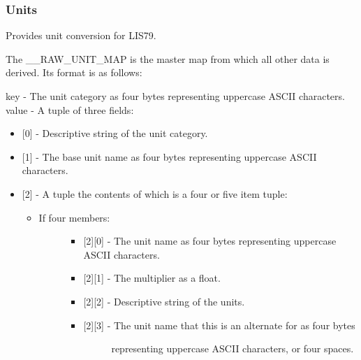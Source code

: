 \documentclass[letterpaper,10pt,english]{sphinxmanual}
\begin{document}
\subsubsection{Units}
\label{\detokenize{ref/LIS/core/Units:units}}\label{\detokenize{ref/LIS/core/Units::doc}}\label{\detokenize{ref/LIS/core/Units:module-TotalDepth.LIS.core.Units}}
Provides unit conversion for LIS79.

The \_\_RAW\_UNIT\_MAP is the master map from which all other data is derived.
Its format is as follows:

key - The unit category as four bytes representing uppercase ASCII characters.
value - A tuple of three fields:
\begin{itemize}
\item {} 
{[}0{]} - Descriptive string of the unit category.

\item {} 
{[}1{]} - The base unit name as four bytes representing uppercase ASCII characters.

\item {} 
{[}2{]} - A tuple the contents of which is a four or five item tuple:
\begin{itemize}
\item {} \begin{description}
\item[{If four members:}] \leavevmode\begin{itemize}
\item {} 
{[}2{]}{[}0{]} - The unit name as four bytes representing uppercase ASCII characters.

\item {} 
{[}2{]}{[}1{]} - The multiplier as a float.

\item {} 
{[}2{]}{[}2{]} - Descriptive string of the units.

\item {} \begin{description}
\item[{{[}2{]}{[}3{]} - The unit name that this is an alternate for as four bytes}] \leavevmode
representing uppercase ASCII characters, or four spaces.

\end{description}

\end{itemize}

\end{description}


\end{itemize}
\end{itemize}
\end{document}
